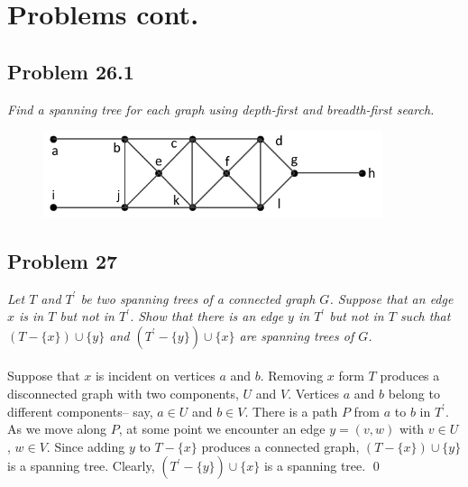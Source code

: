 \documentclass[
        ]{beamer}
\begin{document}
\section{Problems cont.}
    \subsection{Problem 26.1}
        \begin{frame}[c]{\subsecname}
            \emph{Find a spanning tree for each graph using depth-first and breadth-first search.}\\
            \begin{figure}
                \centering
                \includegraphics[width=99.6mm]{tut11p23_1_1}
            \end{figure}
        \end{frame}



    \subsection{Problem 27}
        \begin{frame}[c]{\subsecname}
            \emph{Let $T$ and $T^\prime$ be two spanning trees of a connected graph $G$. Suppose that an edge $x$ is in $T$ but not in $T^\prime$. Show that there is an edge $y$ in $T^\prime$ but not in $T$ such that $( T - \{ x \} ) \cup \{ y \} $ and $(T^\prime - \{ y \} ) \cup \{ x \} $ are spanning trees of $G$.}\\$\;$\\\pause
            Suppose that $x$ is incident on vertices $a$ and $b$. Removing $x$ form $T$ produces a disconnected graph with two components, $U$ and $V$. Vertices $a$ and $b$ belong to different components\--- say, $a \in U$ and $b \in V$. There is a path $P$ from $a$ to $b$ in $T^\prime$. As we move along $P$, at some point we encounter an edge $y=(v,w)$ with $v \in U$, $w \in V$. Since adding $y$ to $T-\{x\}$ produces a connected graph, $(T-\{x\}) \cup \{y\}$ is a spanning tree. Clearly, $(T^\prime-\{y\}) \cup \{x\}$ is a spanning tree. \qed
        \end{frame}
    
\end{document}
